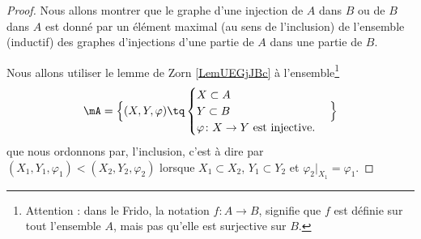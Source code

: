 \begin{proof}
    Nous allons montrer que le graphe d'une injection de $A$ dans $B$ ou de $B$ dans $A$ est donné par un élément maximal (au sens de l'inclusion) de l'ensemble (inductif) des graphes d'injections d'une partie de $A$ dans une partie de $B$.

    Nous allons utiliser le lemme de Zorn \ref{LemUEGjJBc} à l'ensemble\footnote{Attention : dans le Frido, la notation \( f\colon A\to B\), signifie que \( f\) est définie sur tout l'ensemble \( A\), mais pas qu'elle est surjective sur \( B\).}
    \begin{equation}
       \mA=\Big\{  (X,Y,\varphi)  \tq
        \begin{cases}
            X\subset A\\
            Y\subset B\\
            \varphi\colon X\to Y\text{ est injective.}
        \end{cases}
    \Big\}
    \end{equation}
    que nous ordonnons par, l'inclusion, c'est à dire par \( (X_1,Y_1,\varphi_1)<(X_2,Y_2,\varphi_2)\) lorsque \( X_1\subset X_2\), \( Y_{1}\subset Y_2\) et \( \varphi_2|_{X_1}=\varphi_1\).


\end{proof}
